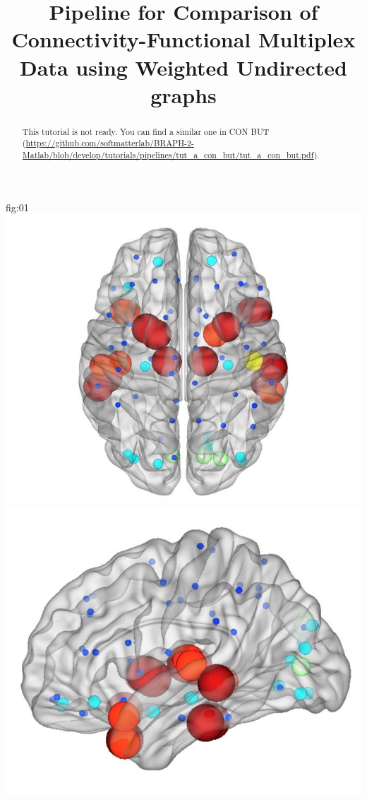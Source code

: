 \documentclass[justified]{tufte-handout}
\title{Pipeline for Comparison of Connectivity-Functional Multiplex Data using Weighted Undirected graphs}
\begin{document}
\maketitle

\begin{abstract}
\noindent
This tutorial is not ready. You can find a similar one in CON BUT (\url{https://github.com/softmatterlab/BRAPH-2-Matlab/blob/develop/tutorials/pipelines/tut_a_con_but/tut_a_con_but.pdf}).
\end{abstract}

	{fig:01}
	{
	\includegraphics{fig01_01.jpg}
	\includegraphics{fig01_02.jpg}
}
\end{document}

